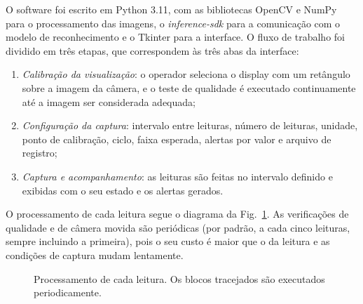 \documentclass[10pt,twocolumn,letterpaper]{article}
\begin{document}
O software foi escrito em Python 3.11, com as bibliotecas OpenCV \cite{opencv}
e NumPy para o processamento das imagens, o \textit{inference-sdk} para a
comunicação com o modelo de reconhecimento e o Tkinter para a interface. O
fluxo de trabalho foi dividido em três etapas, que correspondem às três abas da
interface:

\begin{enumerate}
  \setlength{\itemsep}{0pt}
  \item \textit{Calibração da visualização}: o operador seleciona o display com
        um retângulo sobre a imagem da câmera, e o teste de qualidade é
        executado continuamente até a imagem ser considerada adequada;
  \item \textit{Configuração da captura}: intervalo entre leituras, número de
        leituras, unidade, ponto de calibração, ciclo, faixa esperada, alertas
        por valor e arquivo de registro;
  \item \textit{Captura e acompanhamento}: as leituras são feitas no intervalo
        definido e exibidas com o seu estado e os alertas gerados.
\end{enumerate}

O processamento de cada leitura segue o diagrama da Fig.~\ref{fig:fluxo}. As
verificações de qualidade e de câmera movida são periódicas (por padrão, a
cada cinco leituras, sempre incluindo a primeira), pois o seu custo é maior que
o da leitura e as condições de captura mudam lentamente.

\begin{figure}[!t]
\centering
{}
\caption{Processamento de cada leitura. Os blocos tracejados são executados
periodicamente.}
\label{fig:fluxo}
\end{figure}
\end{document}
